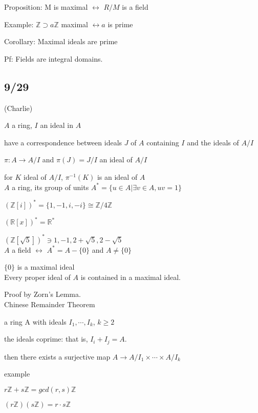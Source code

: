 \documentclass[12pt]{article}
\begin{document}
\noindent
Proposition: M is maximal $\leftrightarrow$ $R/M$ is a field

\noindent
Example: $\mathds{Z} \supset a\mathds{Z}$ maximal $\leftrightarrow a$ is prime

\noindent
Corollary: Maximal ideals are prime

Pf: Fields are integral domains.

\subsection{9/29}

\noindent
(Charlie)

\noindent
$A$ a ring, $I$ an ideal in $A$

have a correspondence between ideals $J$ of $A$ containing $I$ and the ideals of $A/I$

$\pi: A \to A/I$ and $\pi(J) = J/I$ an ideal of $A/I$

for $K$ ideal of $A/I$, $\pi^{-1}(K)$ is an ideal of $ A$\\

\noindent
$A$ a ring, its group of units $A^* = \{u \in A | \exists v \in A, uv = 1\}$

$(\mathds{Z}[i])^* = \{1, -1, i, -i\} \cong \mathds{Z}/4\mathds{Z}$

$(\mathds{R}[x])^* = \mathds{R}^*$

$(\mathds{Z}[\sqrt{5}])^* \ni 1, -1, 2 + \sqrt{5}, 2 - \sqrt{5}$\\

\noindent
$A$ a field $\leftrightarrow$ $A^* = A - \{0\}$ and $A \neq \{0\}$

$\{0\}$ is a maximal ideal\\

\noindent
Every proper ideal of $A$ is contained in a maximal ideal.

Proof by Zorn's Lemma.\\

\noindent
Chinese Remainder Theorem

a ring A with ideals $I_1, \cdots, I_k$, $k \geq 2$

the ideals coprime: that is, $I_i + I_j = A$.

then there exists a surjective map $A \to A/I_1 \times \cdots \times A/I_k$

\noindent
example

$r\mathds{Z} + s\mathds{Z} = gcd(r, s)\mathds{Z}$

$(r\mathds{Z})(s\mathds{Z}) = r\cdot s\mathds{Z}$
\end{document}
